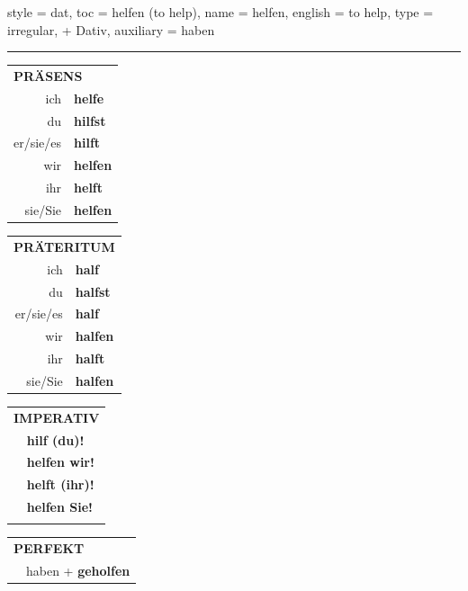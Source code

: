 \begin{verbentry}{
  style = {dat},
  toc = {helfen (to help)},
  name = {helfen},
  english = {to help},
  type = {irregular, + Dativ},
  auxiliary = {haben}
}
 
    
     \vspace{5pt}

    \hrule
    
    \vspace{5pt}

  \begin{tabular}{rl}
     \multicolumn{2}{l}{\textbf{PRÄSENS} }\\
    ich & \textbf{helfe}\\
    du & \textbf{hilfst}\\
    er/sie/es & \textbf{hilft}\\
    wir & \textbf{helfen}\\
    ihr & \textbf{helft}\\
    sie/Sie & \textbf{helfen}\\
  \end{tabular}
  \hfill
     \begin{tabular}{rl}
    \multicolumn{2}{l}{\textbf{PRÄTERITUM} }\\
    ich & \textbf{half}\\
    du & \textbf{halfst}\\
    er/sie/es & \textbf{half}\\
    wir & \textbf{halfen}\\
    ihr & \textbf{halft}\\
    sie/Sie & \textbf{halfen}\\
  \end{tabular}
  \hfill
  \begin{tabular}{rl}
     \multicolumn{2}{l}{\textbf{IMPERATIV} }\\
   & \textbf{hilf (du)!}\\
   & \textbf{helfen wir!}\\
   & \textbf{helft (ihr)!}\\
   & \textbf{helfen Sie!}\\
   & \vspace{10pt}
  \end{tabular}

    \vspace{10pt}

 \begin{tabular}{rl}
     \multicolumn{2}{l}{\textbf{PERFEKT}}\\
  &  haben + \textbf{geholfen}\\
  \end{tabular}
\hfill
   \begin{tabular}{rl}
   

\end{tabular}
\end{verbentry}
